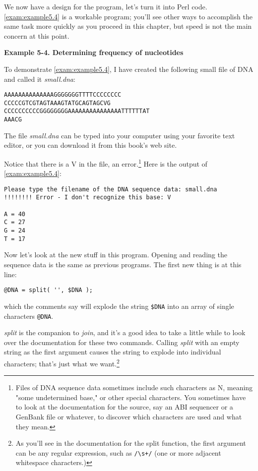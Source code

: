 We now have a design for the program, let's turn it into Perl code.  \autoref{exam:example5.4} is a workable program; you'll see other ways to accomplish the same task more quickly as you proceed in this chapter, but speed is not the main concern at this point. 

\textbf{Example 5-4. Determining frequency of nucleotides}


To demonstrate \autoref{exam:example5.4}, I have created the following small file of DNA and called it \textit{small.dna}: 

\begin{lstlisting}
AAAAAAAAAAAAAAGGGGGGGTTTTCCCCCCCC
CCCCCGTCGTAGTAAAGTATGCAGTAGCVG
CCCCCCCCCCGGGGGGGGAAAAAAAAAAAAAAATTTTTTAT
AAACG
\end{lstlisting}

The file \textit{small.dna} can be typed into your computer using your favorite text editor, or you can download it from this book's web site.

Notice that there is a V in the file, an error.\footnote{Files of DNA sequence data sometimes include such characters as N, meaning "some undetermined base," or other special characters.  You sometimes have to look at the documentation for the source, say an ABI sequencer or a GenBank file or whatever, to discover which characters are used and what they mean.} Here is the output of \autoref{exam:example5.4}:

\begin{lstlisting}
Please type the filename of the DNA sequence data: small.dna
!!!!!!!! Error - I don't recognize this base: V

A = 40
C = 27
G = 24
T = 17
\end{lstlisting}

Now let's look at the new stuff in this program. Opening and reading the sequence data is the same as previous programs. The first new thing is at this line:

\begin{lstlisting}
@DNA = split( '', $DNA );
\end{lstlisting}

which the comments say will explode the string \verb|$DNA| into an array of single characters \verb|@DNA|.

\textit{split} is the companion to \textit{join}, and it's a good idea to take a little while to look over the documentation for these two commands. Calling \textit{split} with an empty string as the first argument causes the string to explode into individual characters; that's just what we want.\footnote{As you'll see in the documentation for the split function, the first argument can be any regular expression, such as \verb|/\s+/| (one or more adjacent whitespace characters.)}

